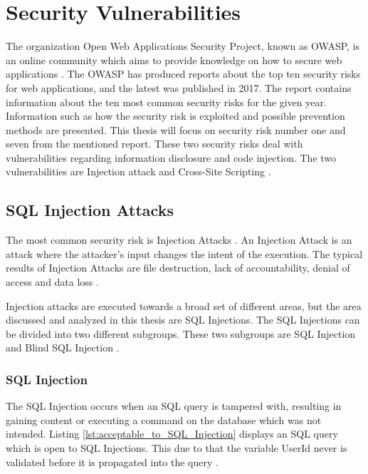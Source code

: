 \section{Security Vulnerabilities}
\label{SecurityVulnerabilities}
The organization Open Web Applications Security Project, known as OWASP, is an online community which aims to provide knowledge on how to secure web applications \parencite{OpenWebApplicationSecurityProject}. The OWASP has produced reports about the top ten security risks for web applications, and the latest was published in 2017. The report contains information about the ten most common security risks for the given year. Information such as how the security risk is exploited and possible prevention methods are presented. This thesis will focus on security risk number one and seven from the mentioned report. These two security risks deal with vulnerabilities regarding information disclosure and code injection. The two vulnerabilities are Injection attack and Cross-Site Scripting \parencite{OWASP2017}.



\subsection{SQL Injection Attacks}
The most common security risk is Injection Attacks \parencite{OWASP2017}. An Injection Attack is an attack where the attacker's input changes the intent of the execution. The typical results of Injection Attacks are file destruction, lack of accountability, denial of access and data loss \parencite{Secure_Web}.

Injection attacks are executed towards a broad set of different areas, but the area discussed and analyzed in this thesis are SQL Injections. The SQL Injections can be divided into two different subgroups. These two subgroups are SQL Injection and Blind SQL Injection \parencite{Secure_Web}.



\subsubsection{SQL Injection}
The SQL Injection occurs when an SQL query is tampered with, resulting in gaining content or executing a command on the database which was not intended. Listing \ref{lst:acceptable_to_SQL_Injection} displays an SQL query which is open to SQL Injections. This due to that the variable UserId never is validated before it is propagated into the query \parencite{JustinClarke-Salt2009SIAa, Secure_Web}.

